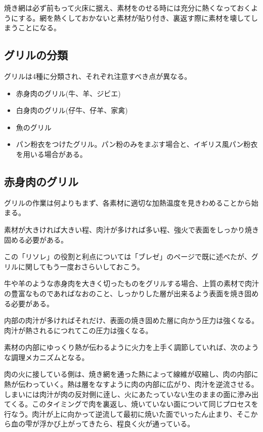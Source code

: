 焼き網は必ず前もって火床に据え、素材をのせる時には充分に熱くなっておくようにする。網を熱くしておかないと素材が貼り付き、裏返す際に素材を壊してしまうことになる。

\hypertarget{ux30b0ux30eaux30ebux306eux5206ux985e}{%
\subsection{グリルの分類}\label{ux30b0ux30eaux30ebux306eux5206ux985e}}

グリルは4種に分類され、それぞれ注意すべき点が異なる。

\begin{itemize}
\tightlist
\item
  赤身肉のグリル(牛、羊、ジビエ)
\item
  白身肉のグリル(仔牛、仔羊、家禽)
\item
  魚のグリル
\item
  パン粉衣をつけたグリル。パン粉のみをまぶす場合と、イギリス風パン粉衣を用いる場合がある。
\end{itemize}

\hypertarget{ux8d64ux8eabux8089ux306eux30b0ux30eaux30eb}{%
\subsection{赤身肉のグリル}\label{ux8d64ux8eabux8089ux306eux30b0ux30eaux30eb}}

グリルの作業は何よりもまず、各素材に適切な加熱温度を見きわめることから始まる。

素材が大きければ大きい程、肉汁が多ければ多い程、強火で表面をしっかり焼き固める必要がある。

この「リソレ」の役割と利点については「ブレゼ」のページで既に述べたが、グリルに関してもう一度おさらいしておこう。

牛や羊のような赤身肉を大きく切ったものをグリルする場合、上質の素材で肉汁の豊富なものであればなおのこと、しっかりした層が出来るよう表面を焼き固める必要がある。

内部の肉汁が多ければそれだけ、表面の焼き固めた層に向かう圧力は強くなる。肉汁が熱されるにつれてこの圧力は強くなる。

素材の内部にゆっくり熱が伝わるように火力を上手く調節していれば、次のような調理メカニズムとなる。

肉の火に接している側は、焼き網を通った熱によって線維が収縮し、肉の内部に熱が伝わっていく。熱は層をなすように肉の内部に広がり、肉汁を逆流させる。しまいには肉汁が肉の反対側に逹し、火にあたっていない生のままの面に滲み出てくる。このタイミングで肉を裏返し、焼いていない面について同じプロセスを行なう。肉汁が上に向かって逆流して最初に焼いた面でいったん止まり、そこから血の雫が浮かび上がってきたら、程良く火が通っている。

